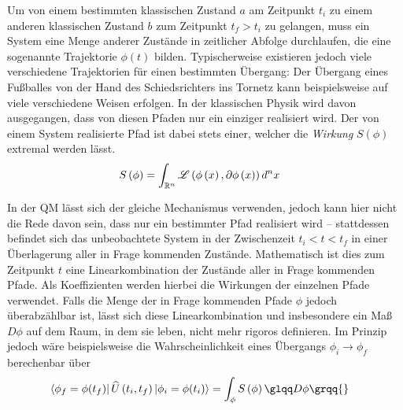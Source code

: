 Um von einem bestimmten klassischen Zustand $a$ am Zeitpunkt $t_i$ zu
einem anderen klassischen Zustand $b$ zum Zeitpunkt $t_f > t_i$ zu
gelangen, muss ein System eine Menge anderer Zustände in zeitlicher
Abfolge durchlaufen, die eine sogenannte Trajektorie $\phi(t)$
bilden. Typischerweise existieren jedoch viele verschiedene
Trajektorien für einen bestimmten Übergang: Der Übergang eines
Fußballes von der Hand des Schiedsrichters ins Tornetz kann
beispielsweise auf viele verschiedene Weisen erfolgen. In der
klassischen Physik wird davon ausgegangen, dass von diesen Pfaden nur
ein einziger realisiert wird. Der von einem System realisierte Pfad
ist dabei stets einer, welcher die \textit{Wirkung} $S(\phi)$ extremal
werden lässt. 
\begin{align}
  S\left(\phi\right) &= \int_{\mathbb{R}^n} \mathscr{L}\left(\phi\left(x\right),\partial \phi\left(x\right) \right) d^nx
\end{align}

In der QM lässt sich der gleiche Mechanismus verwenden, jedoch kann
hier nicht die Rede davon sein, dass nur ein bestimmter Pfad
realisiert wird -- stattdessen befindet sich das unbeobachtete System
in der Zwischenzeit $t_i < t < t_f$ in einer Überlagerung aller in
Frage kommenden Zustände. Mathematisch ist dies zum Zeitpunkt $t$ eine
Linearkombination der Zustände aller in Frage kommenden Pfade. Als
Koeffizienten werden hierbei die Wirkungen der einzelnen Pfade
verwendet. Falls die Menge der in Frage kommenden Pfade $\phi$  jedoch
überabzählbar ist, lässt sich diese Linearkombination und insbesondere
ein Maß \glqq$D\phi$\grqq{} auf dem Raum, in dem sie leben, nicht mehr rigoros
definieren. Im Prinzip jedoch wäre beispielsweise die
Wahrscheinlichkeit eines Übergangs $\phi_i\to\phi_f$ berechenbar über
\begin{align*}
 \bra{\phi_f=\phi(t_f)}
   \widehat{U}\left(t_i,t_f\right)
 \ket{\phi_i=\phi(t_i)}
  &= \int_{\phi} S\left(\phi\right) \glqq D\phi\grqq{}
\end{align*}
